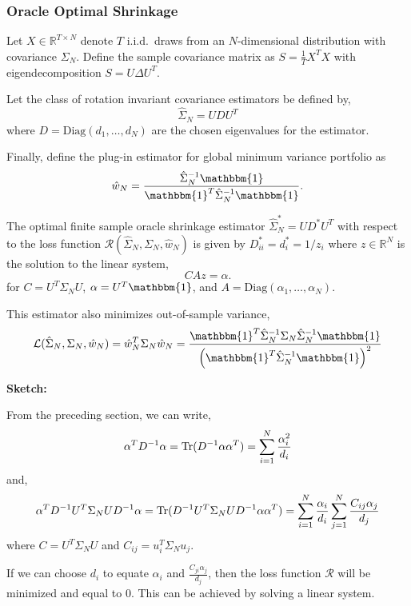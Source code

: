 \documentclass{article}
\begin{document}
\subsubsection{Oracle Optimal Shrinkage}

\begin{thm}
	Let $X \in \mathbb{R}^{T \times N}$ denote $T$ i.i.d.\ draws from an
	$N$-dimensional distribution with covariance $\Sigma_N$.  Define the sample
	covariance matrix as $S = \frac1T X^T X$ with eigendecomposition $S = U\Delta
	U^T$.

	Let the class of rotation invariant covariance estimators be defined by,
	$$
		\hat{\Sigma}_N = U D U^T
	$$
	where $D= \mathrm{Diag}({d}_1, \ldots, {d}_N)$ are the chosen eigenvalues for
	the estimator.

	Finally, define the plug-in estimator for global minimum variance portfolio
	as
	$$
		\hat{w}_N = \frac{\hat{\Sigma}_N^{-1}\mathbbm{1}}
						{\mathbbm{1}^T\hat{\Sigma}_N^{-1}\mathbbm{1}}.
	$$

	The optimal finite sample oracle shrinkage estimator $\hat{\Sigma}^*_N = U D^*
	U^T$ with respect to the loss function $\mathcal{R}(\hat{\Sigma}_N, \Sigma_N,
	\hat{w}_N)$ is given by $D^*_{ii} = d^*_i = 1 / z_i$ where $z \in
	\mathbb{R}^N$ is the solution to the linear system,
	$$
		C A z = \alpha.
	$$
	for $C = U^T\Sigma_N U$, $\alpha = U^T \mathbbm{1}$, and $A =
	\mathrm{Diag}(\alpha_1, \ldots, \alpha_N)$.

	This estimator also minimizes out-of-sample variance,
	$$
		\mathcal{L}(\hat{\Sigma}_N, \Sigma_N, \hat{w}_N)
			 = \hat{w}_N^T \Sigma_N \hat{w}_N
			 = \frac
  				{\mathbbm{1}^T \hat{\Sigma}_N^{-1} \Sigma_N  \hat{\Sigma}_N^{-1} \mathbbm{1}}
  				{\left( \mathbbm{1}^T \hat{\Sigma}_N^{-1} \mathbbm{1}\right)^2}
	$$
\end{thm}

{\bf Sketch:}

From the preceding section, we can write,
$$
	\alpha^T D^{-1} \alpha 
		 = \mathrm{Tr}(D^{-1} \alpha \alpha^T)
		 = \sum_{i=1}^N \frac{\alpha_i^2}{{d}_i}
$$
and,
$$
	\alpha^T D^{-1} U^T\Sigma_N U D^{-1} \alpha
		 = \mathrm{Tr}(D^{-1} U^T\Sigma_N U D^{-1} \alpha \alpha^T)
		 = \sum_{i=1}^N \frac{\alpha_i}{{d}_i} 
		 			\sum_{j=1}^N \frac{C_{ij}\alpha_j}{{d}_j}
$$
where $C = U^T\Sigma_N U$ and $C_{ij} = u_i^T \Sigma_N u_j$.

If we can choose ${d}_i$ to equate $\alpha_i$ and
$\frac{C_{ji}\alpha_j}{{d}_j}$, then the loss function
$\mathcal{R}$ will be minimized and equal to 0.  This can be achieved by solving
a linear system.
\end{document}
